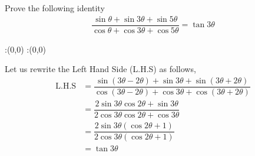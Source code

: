 
%
%
%
%
% 
% 

\question Prove the following identity
\begin{align}
  \dfrac{\sin\theta + \sin 3\theta + \sin 5\theta}
  	{\cos \theta + \cos 3\theta + \cos 5\theta} = \tan 3\theta \nonumber
\end{align}

\insertQR{}

\ifprintanswers
  \begin{marginfigure}
      :(0,0)
      :(0,0)
    \figdrawbegin{}
      \figdrawline [100,101]
    \figdrawend
    \figvisu{\figBoxA}{}{%
    }
    \centerline{\box\figBoxA}
  \end{marginfigure}
\fi 

\begin{solution}
  Let us rewrite the Left Hand Side (L.H.S) as follows,
  \begin{align}
    \text{L.H.S} &= \dfrac{\sin(3\theta - 2\theta ) + \sin 3\theta + 
    						\sin (3\theta + 2\theta)}
  						  {\cos (3\theta - 2\theta) + \cos 3\theta + 
  							\cos (3\theta + 2\theta)} \\
				 &= \dfrac{2\sin 3\theta \cos 2\theta + \sin 3\theta}
				  		  {2\cos 3\theta \cos 2\theta + \cos 3\theta} \\
				 &= \dfrac{2\sin 3\theta(\cos 2\theta + 1)}
				  		  {2\cos 3\theta(\cos 2\theta + 1)} \\
				 &= \tan 3\theta
  \end{align}
\end{solution}